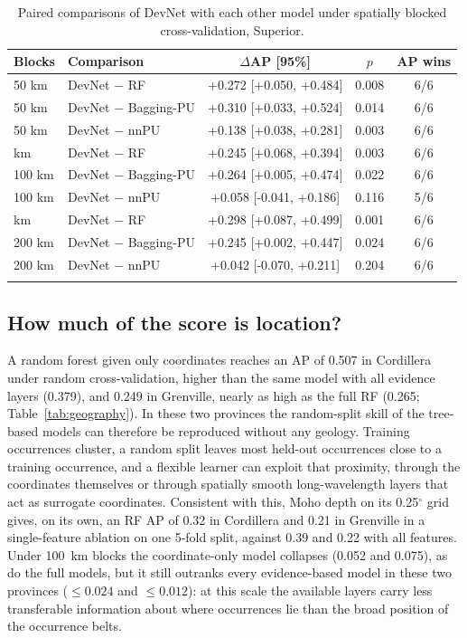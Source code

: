 \documentclass[pdflatex,sn-apa]{sn-jnl}
\begin{document}
\begin{table}[t]
\caption{Paired comparisons of DevNet with each other model under spatially blocked cross-validation, Superior.}\label{tab:spatial-boot}
\footnotesize
\begin{tabular*}{\textwidth}{@{\extracolsep\fill}llccc}
\toprule
Blocks & Comparison & $\Delta$AP [95\%] & $p$ & AP wins \\
\midrule
50 km & DevNet $-$ RF & +0.272 [+0.050, +0.484] & 0.008 & 6/6 \\
50 km & DevNet $-$ Bagging-PU & +0.310 [+0.033, +0.524] & 0.014 & 6/6 \\
50 km & DevNet $-$ nnPU & +0.138 [+0.038, +0.281] & 0.003 & 6/6 \\
\addlinespace
100 km & DevNet $-$ RF & +0.245 [+0.068, +0.394] & 0.003 & 6/6 \\
100 km & DevNet $-$ Bagging-PU & +0.264 [+0.005, +0.474] & 0.022 & 6/6 \\
100 km & DevNet $-$ nnPU & +0.058 [-0.041, +0.186] & 0.116 & 5/6 \\
\addlinespace
200 km & DevNet $-$ RF & +0.298 [+0.087, +0.499] & 0.001 & 6/6 \\
200 km & DevNet $-$ Bagging-PU & +0.245 [+0.002, +0.447] & 0.024 & 6/6 \\
200 km & DevNet $-$ nnPU & +0.042 [-0.070, +0.211] & 0.204 & 6/6 \\
\botrule
\end{tabular*}
\end{table}

\subsection{How much of the score is location?}\label{sec:res-geography}

A random forest given only coordinates reaches an AP of 0.507 in Cordillera under random cross-validation, higher than the same model with all evidence layers (0.379), and 0.249 in Grenville, nearly as high as the full RF (0.265; Table~\ref{tab:geography}). In these two provinces the random-split skill of the tree-based models can therefore be reproduced without any geology. Training occurrences cluster, a random split leaves most held-out occurrences close to a training occurrence, and a flexible learner can exploit that proximity, through the coordinates themselves or through spatially smooth long-wavelength layers that act as surrogate coordinates. Consistent with this, Moho depth on its 0.25$^\circ$ grid gives, on its own, an RF AP of 0.32 in Cordillera and 0.21 in Grenville in a single-feature ablation on one 5-fold split, against 0.39 and 0.22 with all features. Under 100~km blocks the coordinate-only model collapses (0.052 and 0.075), as do the full models, but it still outranks every evidence-based model in these two provinces ($\leq 0.024$ and $\leq 0.012$): at this scale the available layers carry less transferable information about where occurrences lie than the broad position of the occurrence belts.
\end{document}
